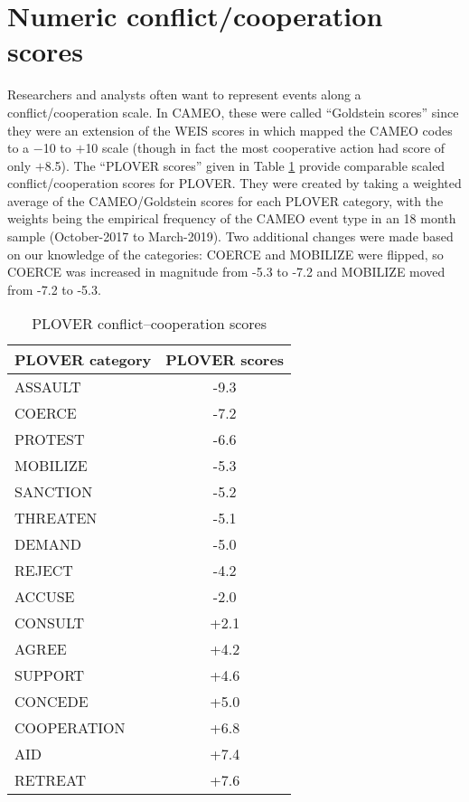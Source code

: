 \documentclass[11pt]{report}
\begin{document}
\clearpage

\section{Numeric conflict/cooperation scores}

Researchers and analysts often want to represent events along a conflict/cooperation scale. In CAMEO, these were called ``Goldstein scores'' since they were an extension of the WEIS scores in \cite{Goldstein92} which mapped the CAMEO codes to a $-$10 to $+$10 scale (though in fact the most cooperative action had score of only $+$8.5). The ``PLOVER scores'' given in Table \ref{tab:ploverscores} provide comparable scaled conflict/cooperation scores for PLOVER. They were created by taking a weighted average of the CAMEO/Goldstein scores for each PLOVER category, with the weights being the empirical frequency of the CAMEO event type in an 18 month sample (October-2017 to March-2019). Two additional changes were made based on our knowledge of the categories: COERCE and MOBILIZE were flipped, so COERCE was increased in magnitude from -5.3 to -7.2 and MOBILIZE moved from -7.2 to -5.3.

\begin{table}[htp]
\begin{center}
\caption{PLOVER conflict--cooperation scores}
\begin{tabular}{lc}
\hline
\textbf{PLOVER category} & \textbf{PLOVER scores} \\
\hline
ASSAULT  & -9.3\\
COERCE & -7.2\\
PROTEST & -6.6\\
MOBILIZE & -5.3\\
SANCTION & -5.2\\
THREATEN & -5.1\\
DEMAND & -5.0\\
REJECT & -4.2\\
ACCUSE &  -2.0\\
CONSULT &  +2.1\\
AGREE & +4.2\\
SUPPORT & +4.6\\
CONCEDE & +5.0\\
COOPERATION & +6.8\\
AID & +7.4\\
RETREAT & +7.6 \\
\hline
\end{tabular}
\end{center}
\label{tab:ploverscores}
\end{table}
\end{document}

